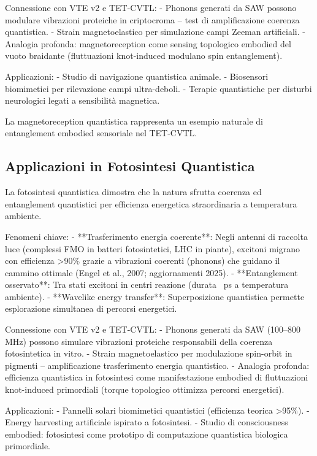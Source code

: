 \documentclass[11pt,a4paper]{article}
\begin{document}
Connessione con VTE v2 e TET-CVTL:
- Phonons generati da SAW possono modulare vibrazioni proteiche in criptocroma – test di amplificazione coerenza quantistica.
- Strain magnetoelastico per simulazione campi Zeeman artificiali.
- Analogia profonda: magnetoreception come sensing topologico embodied del vuoto braidante (fluttuazioni knot-induced modulano spin entanglement).

Applicazioni:
- Studio di navigazione quantistica animale.
- Biosensori biomimetici per rilevazione campi ultra-deboli.
- Terapie quantistiche per disturbi neurologici legati a sensibilità magnetica.

La magnetoreception quantistica rappresenta un esempio naturale di entanglement embodied sensoriale nel TET-CVTL.

\subsection{Applicazioni in Fotosintesi Quantistica}

La fotosintesi quantistica dimostra che la natura sfrutta coerenza ed entanglement quantistici per efficienza energetica straordinaria a temperatura ambiente.

Fenomeni chiave:
- **Trasferimento energia coerente**: Negli antenni di raccolta luce (complessi FMO in batteri fotosintetici, LHC in piante), excitoni migrano con efficienza >90\% grazie a vibrazioni coerenti (phonons) che guidano il cammino ottimale (Engel et al., 2007; aggiornamenti 2025).
- **Entanglement osservato**: Tra stati excitoni in centri reazione (durata ~ps a temperatura ambiente).
- **Wavelike energy transfer**: Superposizione quantistica permette esplorazione simultanea di percorsi energetici.

Connessione con VTE v2 e TET-CVTL:
- Phonons generati da SAW (100–800 MHz) possono simulare vibrazioni proteiche responsabili della coerenza fotosintetica in vitro.
- Strain magnetoelastico per modulazione spin-orbit in pigmenti – amplificazione trasferimento energia quantistico.
- Analogia profonda: efficienza quantistica in fotosintesi come manifestazione embodied di fluttuazioni knot-induced primordiali (torque topologico ottimizza percorsi energetici).

Applicazioni:
- Pannelli solari biomimetici quantistici (efficienza teorica >95\%).
- Energy harvesting artificiale ispirato a fotosintesi.
- Studio di consciousness embodied: fotosintesi come prototipo di computazione quantistica biologica primordiale.
\end{document}
